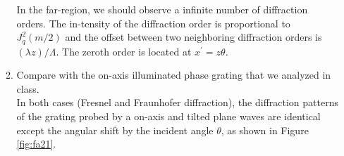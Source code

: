 \documentclass[main.tex]{subfiles}
\begin{document}
\begin{enumerate}
\begin{enumerate}
In the far-region, we should observe a infinite number of diffraction orders. The in-tensity of the diffraction order is proportional to $J_q^2(m/2)$ and the offset between two neighboring diffraction orders is $(\lambda z)/\Lambda$. The zeroth order is located at $x^{\prime}=z\theta$.

\item{Compare with the on-axis illuminated phase grating that we analyzed in class.}\\

In both cases (Fresnel and Fraunhofer diffraction), the diffraction patterns of the grating probed by a on-axis and tilted plane waves are identical except the angular shift by the incident angle $\theta$, as shown in Figure \ref{fig:fa21}.


\end{enumerate}
\end{enumerate}
\end{document}
